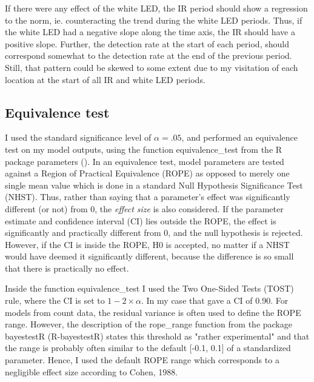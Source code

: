 If there were any effect of the white LED, the IR period should show a regression to the norm, ie. counteracting the trend during the white LED periods.
Thus, if the white LED had a negative slope along the time axis, the IR should have a positive slope.
Further, the detection rate at the start of each period, should correspond somewhat to the detection rate at the end of the previous period. Still, that pattern could be skewed to some extent due to my visitation of each location at the start of all IR and white LED periods.






\subsection*{Equivalence test}
I used the standard significance level of $\alpha = .05$, and performed an equivalence test on my model outputs, using the function equivalence\_test from the R package parameters (\cite{R-parameters}).
In an equivalence test, model parameters are tested against a Region of Practical Equivalence (ROPE) as opposed to merely one single mean value which is done in a standard Null Hypothesis Significance Test (NHST).
Thus, rather than saying that a parameter's effect was significantly different (or not) from 0, the \emph{effect size} is also considered.
If the parameter estimate and confidence interval (CI) lies outside the ROPE, the effect is significantly and practically different from 0, and the null hypothesis is rejected.
However, if the CI is inside the ROPE, H0 is accepted, no matter if a NHST would have deemed it significantly different, because the difference is so small that there is practically no effect.



Inside the function equivalence\_test I used the Two One-Sided Tests (TOST) rule, where the CI is set to $1 - 2\times \alpha$. In my case that gave a CI of 0.90.
For models from count data, the residual variance is often used to define the ROPE range. However, the description of the rope\_range function from the package bayestestR (R-bayestestR) states this threshold as "rather experimental" and that the range is probably often similar to the default [-0.1, 0.1] of a standardized parameter.
Hence, I used the default ROPE range which corresponds to a negligible effect size according to Cohen, 1988.











